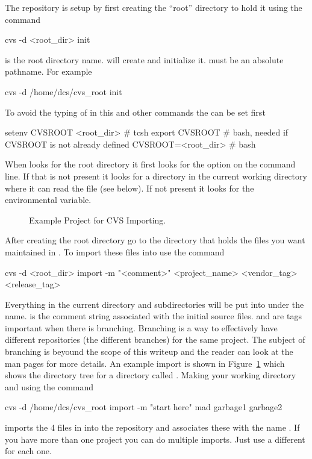 The \cvs repository is setup by first creating the ``root'' directory
to hold it using the command
\begin{example}
  cvs -d <root_dir> init
\end{example}
 is the root directory name. \cvs will create
 and initialize it.  must be an
absolute pathname. For example
\begin{example}
  cvs -d /home/dcs/cvs_root init
\end{example}

To avoid the typing of  in this and other commands the
 can be set first
\begin{example}
  setenv CVSROOT <root_dir> # tcsh
  export CVSROOT            # bash, needed if CVSROOT is not already defined
  CVSROOT=<root_dir>        # bash
\end{example}
When \cvs looks for the \cvs root directory it first looks for the
 option on the command line. If that is not present it looks
for a  directory in the current working directory where it can
read the  file (see below). If not present it looks for the
 environmental variable.

\begin{figure}[htb]
\begin{centering}
\caption{Example Project for CVS Importing.}
\end{centering}
\label{f:cvs1}
\end{figure}

After creating the root directory go to the directory that holds the
files you want maintained in \cvs. To import these files into
\cvs use the command
\begin{example}
    cvs -d <root_dir> import -m "<comment>" <project_name> <vendor_tag> <release_tag>
\end{example}
Everything in the current directory and subdirectories will be put
into \cvs under the  name.   is the
comment string associated with the initial source
files.  and  are tags important
when there is branching. Branching is a way to effectively have
different repositories (the different branches) for the same
project. The subject of branching is beyound the scope of this writeup
and the reader can look at the \cvs man pages for more details.  An
example import is shown in Figure~\ref{f:cvs1} which shows the
directory tree for a directory called
.  Making  your working
directory and using the command
\begin{example}
    cvs -d /home/dcs/cvs_root import -m "start here" mad garbage1 garbage2
\end{example}
imports the 4 files in  into the repository and
associates these with the name . If you have more than one
project you can do multiple imports. Just use a different
 for each one.


